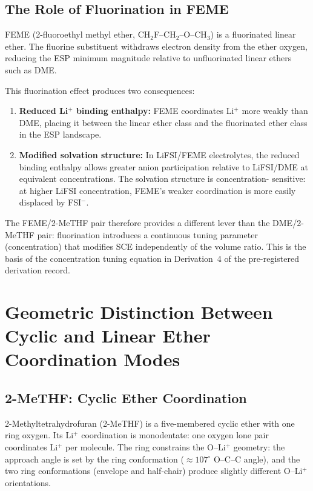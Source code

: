 \documentclass[11pt]{article}
\theoremstyle{plain}
\theoremstyle{definition}
\theoremstyle{remark}
\begin{document}
\subsection{The Role of Fluorination in FEME}

FEME (2-fluoroethyl methyl ether, CH$_2$F--CH$_2$--O--CH$_3$) is a
fluorinated linear ether.  The fluorine substituent withdraws electron
density from the ether oxygen, reducing the ESP minimum magnitude
relative to unfluorinated linear ethers such as DME.

This fluorination effect produces two consequences:
\begin{enumerate}[leftmargin=2em]
  \item \textbf{Reduced Li$^+$ binding enthalpy:} FEME coordinates
        Li$^+$ more weakly than DME, placing it between the linear
        ether class and the fluorinated ether class in the ESP
        landscape.
  \item \textbf{Modified solvation structure:} In LiFSI/FEME
        electrolytes, the reduced binding enthalpy allows greater
        anion participation relative to LiFSI/DME at equivalent
        concentrations.  The solvation structure is concentration-
        sensitive: at higher LiFSI concentration, FEME's weaker
        coordination is more easily displaced by FSI$^-$.
\end{enumerate}

The FEME/2-MeTHF pair therefore provides a different lever than the
DME/2-MeTHF pair: fluorination introduces a continuous tuning
parameter (concentration) that modifies SCE independently of the
volume ratio.  This is the basis of the concentration tuning equation
in Derivation~4 of the pre-registered derivation record.

\section{Geometric Distinction Between Cyclic and Linear Ether\\
Coordination Modes}
\label{sec:geometric_distinction}

\subsection{2-MeTHF: Cyclic Ether Coordination}

2-Methyltetrahydrofuran (2-MeTHF) is a five-membered cyclic ether with
one ring oxygen.  Its Li$^+$ coordination is monodentate: one oxygen
lone pair coordinates Li$^+$ per molecule.  The ring constrains the
O--Li$^+$ geometry: the approach angle is set by the ring conformation
($\approx 107^\circ$ O--C--C angle), and the two ring conformations
(envelope and half-chair) produce slightly different O--Li$^+$
orientations.
\end{document}
